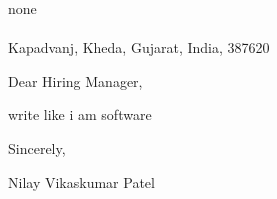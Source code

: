 \documentclass[11pt,a4paper]{letter}
\begin{document}
\begin{letter}{none\\
\\
Kapadvanj, Kheda, Gujarat, India, 387620}

\address{Nilay Vikaskumar Patel\\
B-3 SHAGUN AVENUE Kapadvanj\\
Kapadvanj, Kheda, Gujarat, India, 387620\\
09016989674\\
nilaypatel10721@gmail.com}

\date{April 11, 2025}

\opening{Dear Hiring Manager,}

write like i am software

\vspace{\baselineskip}
\noindent


\closing{Sincerely,}

\vspace{0.5in}
Nilay Vikaskumar Patel

\end{letter}
\end{document}
